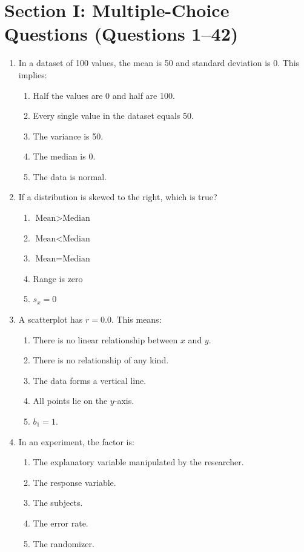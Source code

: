 \section{Section I: Multiple-Choice Questions (Questions 1--42)}
\begin{enumerate}[leftmargin=1.5em]
  \item In a dataset of 100 values, the mean is 50 and standard deviation is 0. This implies:
  \begin{enumerate}[label=(\Alph*)]
    \item Half the values are 0 and half are 100. \item Every single value in the dataset equals 50. \item The variance is 50. \item The median is 0. \item The data is normal.
  \end{enumerate}

  \item If a distribution is skewed to the right, which is true?
  \begin{enumerate}[label=(\Alph*)]
    \item $\text{Mean} > \text{Median}$ \item $\text{Mean} < \text{Median}$ \item $\text{Mean} = \text{Median}$ \item Range is zero \item $s_x = 0$
  \end{enumerate}

  \item A scatterplot has $r = 0.0$. This means:
  \begin{enumerate}[label=(\Alph*)]
    \item There is no linear relationship between $x$ and $y$. \item There is no relationship of any kind. \item The data forms a vertical line. \item All points lie on the $y$-axis. \item $b_1 = 1$.
  \end{enumerate}

  \item In an experiment, the factor is:
  \begin{enumerate}[label=(\Alph*)]
    \item The explanatory variable manipulated by the researcher. \item The response variable. \item The subjects. \item The error rate. \item The randomizer.
  \end{enumerate}


\end{enumerate}
